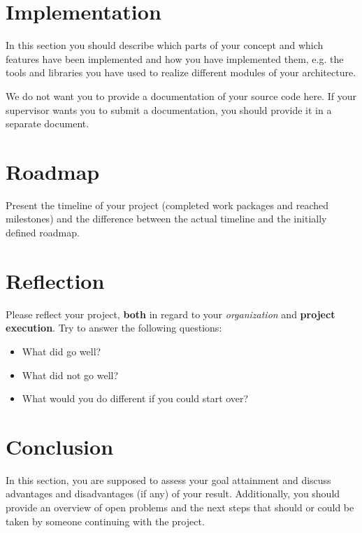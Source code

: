 \documentclass{scrarticle}
\begin{document}
\section{Implementation}
In this section you should describe which parts of your concept and which features have been implemented and how you have implemented them, e.g. the tools and libraries you have used to realize different modules of your architecture.

We do not want you to provide a documentation of your source code here. If your supervisor wants you to submit a documentation, you should provide it in a separate document.


\section{Roadmap}

Present the timeline of your project (completed work packages and reached milestones) and the difference between the actual timeline and the initially defined roadmap.

\section{Reflection}
Please reflect your project, \textbf{both} in regard to your \textit{organization} and \textbf{project execution}. Try to answer the following questions:
\begin{itemize}
	\item What did go well?
	\item What did not go well?
	\item What would you do different if you could start over?
\end{itemize}

\section{Conclusion}
In this section, you are supposed to assess your goal attainment and discuss advantages and disadvantages (if any) of your result. Additionally, you should provide an overview of open problems and the next steps that should or could be taken by someone continuing with the project.


\newpage


\end{document}
